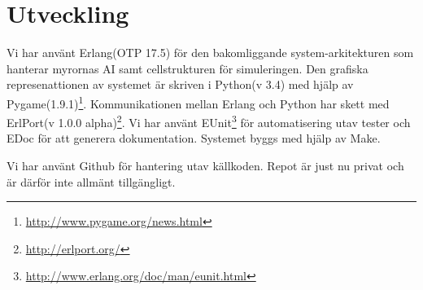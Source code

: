 \chapter{Utveckling}

\label{Utveckling} 


Vi har använt Erlang(OTP 17.5) för den bakomliggande system-arkitekturen som hanterar myrornas AI samt cellstrukturen för simuleringen. Den grafiska represenattionen av systemet är skriven i Python(v 3.4) med hjälp av Pygame(1.9.1)\footnote{\url{http://www.pygame.org/news.html}}. Kommunikationen mellan Erlang och Python har skett med ErlPort(v 1.0.0 alpha)\footnote{\url{http://erlport.org/}}. Vi har använt EUnit\footnote{\url{http://www.erlang.org/doc/man/eunit.html}} för automatisering utav tester och EDoc för att generera dokumentation. Systemet byggs med hjälp av Make.


Vi har använt Github för hantering utav källkoden. Repot är just nu privat och är därför inte allmänt tillgängligt.

